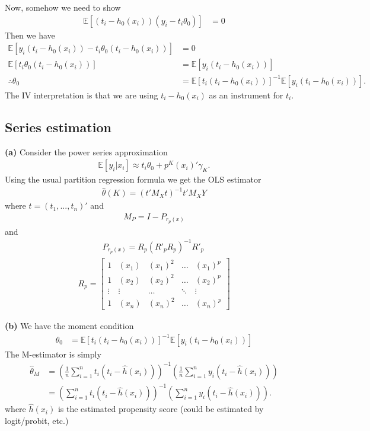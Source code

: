 \documentclass[12pt]{article}
\newcommand{\E}{\mathbb{E}}
\newcommand{\mtx}[1]{\ensuremath{\bm{\mathit{#1}}}}
\begin{document}
Now, somehow we need to show
\begin{align*}
\E[(t_i-h_0(\mtx{x}_i))(y_i - t_i\theta_0)]&=0
\end{align*}
Then we have
\begin{align*}
\E[y_i (t_i-h_0(\mtx{x}_i))- t_i\theta_0(t_i-h_0(\mtx{x}_i))]&=0\\
\E[t_i\theta_0(t_i-h_0(\mtx{x}_i))] &= \E[y_i (t_i-h_0(\mtx{x}_i))]\\
\therefore \theta_0 &= \E[t_i(t_i-h_0(\mtx{x}_i))]^{-1}\E[y_i (t_i-h_0(\mtx{x}_i))].
\end{align*}
The IV interpretation is that we are using $t_i-h_0(\mtx{x}_i)$ as an instrument for $t_i$.

\subsection{Series estimation}
\textbf{(a)} Consider the power series approximation
\begin{align*}
\E[y_i |\mtx{x}_i] \approx t_i \theta_0 + \mtx{p}^K(\mtx{x}_i)'\mtx{\gamma}_K.
\end{align*}
Using the usual partition regression formula we get the OLS estimator
\begin{align*}
\hat \theta(K) = (\mtx{t}'\mtx{M}_{X}\mtx{t})^{-1}\mtx{t}'\mtx{M}_X\mtx{Y}
\end{align*}
where $\mtx{t} = (t_1, ...,t_n)'$ and 
\begin{align*}
\mtx{M}_P = \mtx{I} - \mtx{P}_{r_p(x)}
\end{align*}
and
\begin{align*}
\mtx{P}_{r_p(x)} =\mtx{R}_p \left(\mtx{R}'_p \mtx{R}_p \right)^{-1} \mtx{R}'_p \
\end{align*}
\begin{align*}
\mtx{R}_p = 
\begin{bmatrix}
1 & (\mtx{x}_1) & (\mtx{x}_1)^2 & \dots& (\mtx{x}_1)^p \\
1 & (\mtx{x}_2) & (\mtx{x}_2)^2 & \dots& (\mtx{x}_2)^p\\
\vdots & \vdots & \dots & \ddots & \vdots \\
1 & (\mtx{x}_n) & (\mtx{x}_n)^2 & \dots& (\mtx{x}_n)^p
\end{bmatrix}
\end{align*}

\textbf{(b)}
We have the moment condition
\begin{align*}
\theta_0 &= \E[t_i(t_i-h_0(\mtx{x}_i))]^{-1}\E[y_i (t_i-h_0(\mtx{x}_i))]
\end{align*}
The M-estimator is simply
\begin{align*}
\hat \theta_M &=\left(\frac{1}{n}\sum_{i=1}^nt_i(t_i-\hat h(\mtx{x}_i))\right)^{-1} \left(\frac{1}{n}\sum_{i=1}^n y_i (t_i-\hat h(\mtx{x}_i))\right)\\
&=\left(\sum_{i=1}^nt_i(t_i- \hat h(\mtx{x}_i))\right)^{-1} \left(\sum_{i=1}^n y_i (t_i- \hat h(\mtx{x}_i))\right).
\end{align*}
where $\hat h(\mtx{x}_i)$ is the estimated propensity score (could be estimated by logit/probit, etc.)
\end{document}
